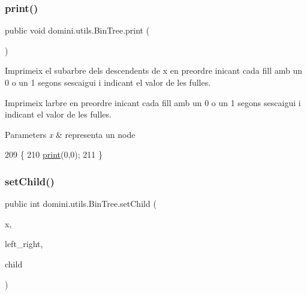 \subsubsection{\texorpdfstring{print()}{print()}\hspace{0.1cm}{\footnotesize\ttfamily [2/2]}}
{\footnotesize\ttfamily public void domini.\+utils.\+Bin\+Tree.\+print (\begin{DoxyParamCaption}{ }\end{DoxyParamCaption})\hspace{0.3cm}{\ttfamily [inline]}}



Imprimeix el subarbre dels descendents de x en preordre inicant cada fill amb un 0 o un 1 segons s\textquotesingle{}escaigui i indicant el valor de les fulles. 

Imprimeix l\textquotesingle{}arbre en preordre inicant cada fill amb un 0 o un 1 segons s\textquotesingle{}escaigui i indicant el valor de les fulles.


\begin{DoxyParams}{Parameters}
{\em x} & representa un node \\
\hline
\end{DoxyParams}

\begin{DoxyCode}
209                         \{
210         \hyperlink{classdomini_1_1utils_1_1BinTree_a0dc4daeb2d0e221cc8fc702d1d0ec795}{print}(0,0);
211     \}
\end{DoxyCode}
\mbox{\label{classdomini_1_1utils_1_1BinTree_adbbdac6bb04a03f8f13c9152940ebbc6}} 
\subsubsection{\texorpdfstring{set\+Child()}{setChild()}}
{\footnotesize\ttfamily public int domini.\+utils.\+Bin\+Tree.\+set\+Child (\begin{DoxyParamCaption}\item[{int}]{x,  }\item[{int}]{left\+\_\+right,  }\item[{\hyperlink{classdomini_1_1utils_1_1BinTree}{Bin\+Tree}}]{child }\end{DoxyParamCaption})\hspace{0.3cm}{\ttfamily [inline]}}



